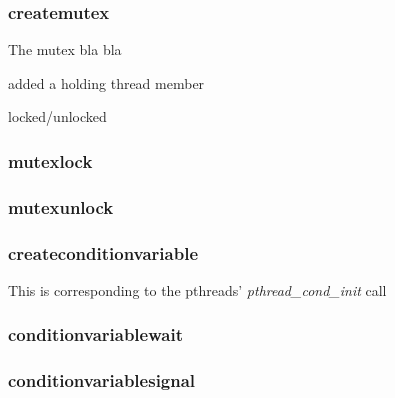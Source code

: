 \subsubsection*{createmutex}
The mutex bla bla

added a holding thread member

locked/unlocked

\subsubsection*{mutexlock}
\subsubsection*{mutexunlock}

\subsubsection*{createconditionvariable}
This is corresponding to the pthreads' \emph{pthread\_cond\_init} call
\subsubsection*{conditionvariablewait}
\subsubsection*{conditionvariablesignal}




